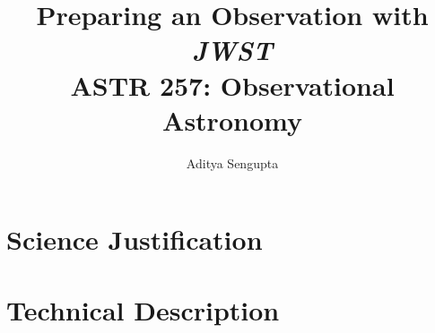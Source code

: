 \documentclass{article}
\title{Preparing an Observation with \textit{JWST} \\ ASTR 257: Observational Astronomy}
\author{Aditya Sengupta}
\begin{document}
    \maketitle
    \section{Science Justification}

    \section{Technical Description}
\end{document}
